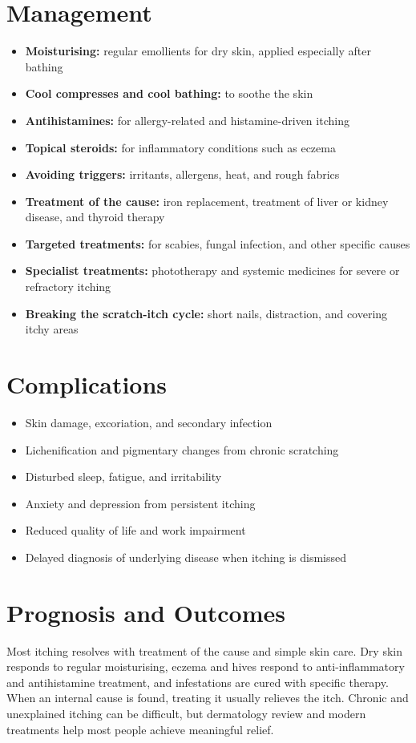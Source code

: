 \section*{Management}
\begin{itemize}
    \item \textbf{Moisturising:} regular emollients for dry skin, applied especially after bathing
    \item \textbf{Cool compresses and cool bathing:} to soothe the skin
    \item \textbf{Antihistamines:} for allergy-related and histamine-driven itching
    \item \textbf{Topical steroids:} for inflammatory conditions such as eczema
    \item \textbf{Avoiding triggers:} irritants, allergens, heat, and rough fabrics
    \item \textbf{Treatment of the cause:} iron replacement, treatment of liver or kidney disease, and thyroid therapy
    \item \textbf{Targeted treatments:} for scabies, fungal infection, and other specific causes
    \item \textbf{Specialist treatments:} phototherapy and systemic medicines for severe or refractory itching
    \item \textbf{Breaking the scratch-itch cycle:} short nails, distraction, and covering itchy areas
\end{itemize}

\section*{Complications}
\begin{itemize}
    \item Skin damage, excoriation, and secondary infection
    \item Lichenification and pigmentary changes from chronic scratching
    \item Disturbed sleep, fatigue, and irritability
    \item Anxiety and depression from persistent itching
    \item Reduced quality of life and work impairment
    \item Delayed diagnosis of underlying disease when itching is dismissed
\end{itemize}

\section*{Prognosis and Outcomes}
Most itching resolves with treatment of the cause and simple skin care. Dry skin responds to regular moisturising, eczema and hives respond to anti-inflammatory and antihistamine treatment, and infestations are cured with specific therapy. When an internal cause is found, treating it usually relieves the itch. Chronic and unexplained itching can be difficult, but dermatology review and modern treatments help most people achieve meaningful relief.

